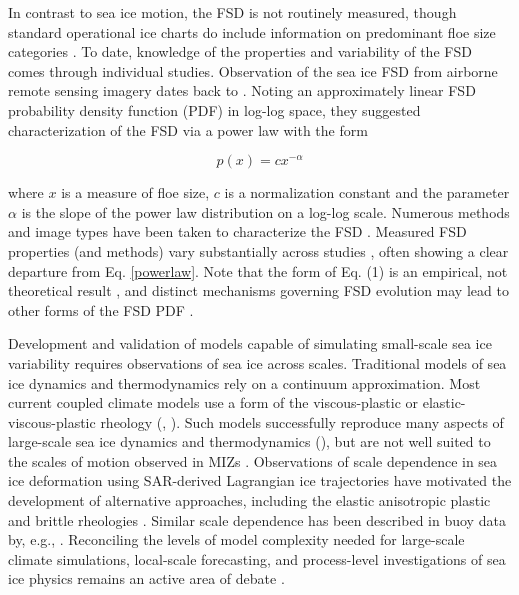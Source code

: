 \documentclass[aog]{igs}
\begin{document}
In contrast to sea ice motion, the FSD is not routinely measured, though standard operational ice charts do include information on predominant floe size categories \citep{dedrickUSNationalNaval2001, afanasyevaAARIMethodologySea2019}. 
To date, knowledge of the properties and variability of the FSD comes through individual studies.
Observation of the sea ice FSD from airborne remote sensing imagery dates back to \cite{rothrock1984_MeasuringSea}.
Noting an approximately linear FSD probability density function (PDF) in log-log space, they suggested characterization of the FSD via a power law with the form
\begin{linenomath*}
\begin{equation}
    p(x) = cx^{-\alpha} \label{powerlaw}
\end{equation}
\end{linenomath*}
where $x$ is a measure of floe size, $c$ is a normalization constant and the parameter $\alpha$ is the slope of the power law distribution on a log-log scale.
Numerous methods and image types have been taken to characterize the FSD \citep{pagetDeterminingFloesizeDistribution2001,  toyota2006_CharacteristicsSea, hwang2013_IntercomparisonSatellite}.
Measured FSD properties (and methods) vary substantially across studies \citep{stern2018_ReconcilingDisparate}, often showing a clear departure from Eq. \ref{powerlaw}. 
Note that the form of Eq. (1) is an empirical, not theoretical result \citep{herman2010_SeaiceFloesize}, and distinct mechanisms governing FSD evolution may lead to other forms of the FSD PDF \citep{montiel2022_TheoreticalFrameworka, mokus2022_WavetriggeredBreakup}.

Development and validation of models capable of simulating small-scale sea ice variability requires observations of sea ice across scales.
Traditional models of sea ice dynamics and thermodynamics rely on a continuum approximation. Most current coupled climate models use a form of the viscous-plastic or elastic-viscous-plastic rheology (\cite{Hibler1979}, \cite{hunke1997_ElasticViscous, tandon2018_ReassessingSea}).
Such models successfully reproduce many aspects of large-scale sea ice dynamics and thermodynamics (\cite{hutter2018_ScalingProperties, zhang2021_SeaIce}), but are not well suited to the scales of motion observed in MIZs \citep{herman2022_GranularEffects}.
Observations of scale dependence in sea ice deformation using SAR-derived Lagrangian ice trajectories \citep{Marsan2004, Stern2009} have motivated the development of alternative approaches, including the elastic anisotropic plastic \citep{tsamados2013_ImpactNew, heorton2018_StressDeformation} and brittle rheologies \citep{Girard2011, rampal2016_NeXtSIMNew, olason2022_NewBrittle}.  Similar scale dependence has been described in buoy data by, e.g., \cite{Rampal2008}.
Reconciling the levels of model complexity needed for large-scale climate simulations, local-scale forecasting, and process-level investigations of sea ice physics remains an active area of debate \citep{blockleyFutureSeaIce2020}.
\end{document}
